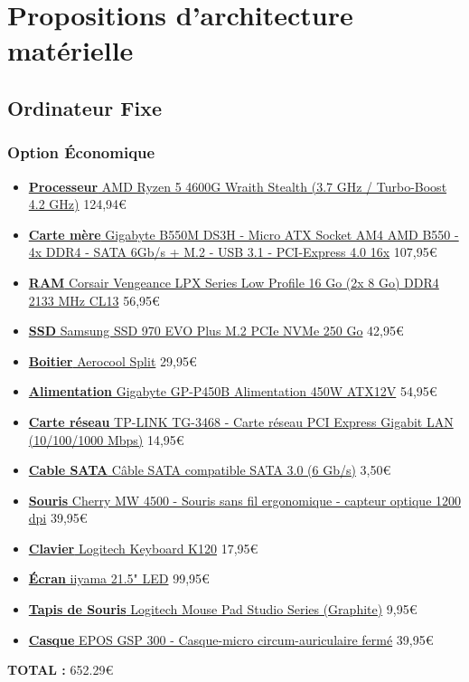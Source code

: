 \chapter{Propositions d'architecture matérielle}

\section{Ordinateur Fixe}

\subsection{Option Économique}

\begin{itemize}
	\item \href{https://www.ldlc.com/fiche/PB00497963.html}{\textbf{Processeur} AMD Ryzen 5 4600G Wraith Stealth (3.7 GHz / Turbo-Boost 4.2 GHz)} 124,94\euro
	\item \href{https://www.ldlc.com/fiche/PB00345955.html}{\textbf{Carte mère} Gigabyte B550M DS3H - Micro ATX Socket AM4 AMD B550 - 4x DDR4 - SATA 6Gb/s + M.2 - USB 3.1 - PCI-Express 4.0 16x} 107,95\euro
	\item \href{https://www.ldlc.com/fiche/PB00191544.html}{\textbf{RAM} Corsair Vengeance LPX Series Low Profile 16 Go (2x 8 Go) DDR4 2133 MHz CL13} 56,95\euro
	\item \href{https://www.ldlc.com/fiche/PB00265389.html}{\textbf{SSD} Samsung SSD 970 EVO Plus M.2 PCIe NVMe 250 Go} 42,95\euro
	\item \href{https://www.ldlc.com/fiche/PB00278344.html}{\textbf{Boitier} Aerocool Split} 29,95\euro
	\item \href{https://www.ldlc.com/fiche/PB00401724.html}{\textbf{Alimentation} Gigabyte GP-P450B Alimentation 450W ATX12V} 54,95\euro
	\item \href{https://www.ldlc.com/fiche/PB00103034.html}{\textbf{Carte réseau} TP-LINK TG-3468 - Carte réseau PCI Express Gigabit LAN (10/100/1000 Mbps)} 14,95\euro
	\item \href{https://www.ldlc.com/fiche/PB00016236.html}{\textbf{Cable SATA} Câble SATA compatible SATA 3.0 (6 Gb/s)} 3,50\euro
	\item \href{https://www.ldlc.com/fiche/PB00243882.html}{\textbf{Souris} Cherry MW 4500 - Souris sans fil ergonomique - capteur optique 1200 dpi} 39,95\euro
	\item \href{https://www.ldlc.com/fiche/PB00103723.html}{\textbf{Clavier} Logitech Keyboard K120} 17,95\euro
	\item \href{https://www.ldlc.com/fiche/PB00543634.html}{\textbf{Écran} iiyama 21.5" LED} 99,95\euro
	\item \href{https://www.ldlc.com/fiche/PB00466685.html}{\textbf{Tapis de Souris} Logitech Mouse Pad Studio Series (Graphite)} 9,95\euro
	\item \href{https://www.ldlc.com/fiche/PB00351651.html}{\textbf{Casque} EPOS GSP 300 - Casque-micro circum-auriculaire fermé} 39,95\euro
\end{itemize}
\vspace{5px}
\textbf{TOTAL :} 652.29\euro

